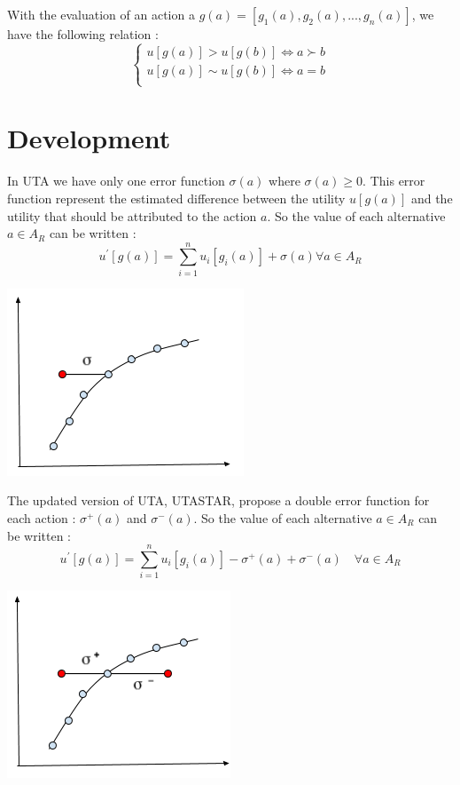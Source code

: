 \documentclass{report}
\begin{document}
With the evaluation of an action a $g(a) = [g_1(a) ,  g_2(a) , ... , g_n(a)] $, we have the following relation :
\begin{equation}
      \begin{cases}
      	u[g(a)] > u[g(b)] \Leftrightarrow a \succ b\\
      	u[g(a)] \sim u[g(b)] \Leftrightarrow a = b\\
      \end{cases}
\end{equation}
\newpage
\section{Development} 
In UTA we have only one error function $\sigma (a)$ where $\sigma (a) \geq 0$. This error function represent the estimated difference between the utility $u[g(a)]$ and the utility that should be attributed to the action $a$. So the value of each alternative $a \in A_R$ can be written : \\
\begin{equation}
	u^{'} [g(a)] = \sum_{i=1}^{n} u_i [g_i (a)] + \sigma (a)   \forall a \in A_R
\end{equation}
\begin{center}
\includegraphics{error-function-uta} 
\end{center}
The updated version of UTA, UTASTAR, propose a double error function for each action : $\sigma ^{+} (a)$ and $\sigma ^{-} (a)$.  So the value of each alternative $a \in A_R$ can be written : \\
\begin{equation}
	u^{'} [g(a)] = \sum_{i=1}^{n} u_i [g_i (a)] - \sigma ^{+} (a)+ \sigma ^{-} (a) \quad  \forall a \in A_R
\end{equation}
\begin{center}
\includegraphics{error-function-utastar}
\end{center}
\end{document}
